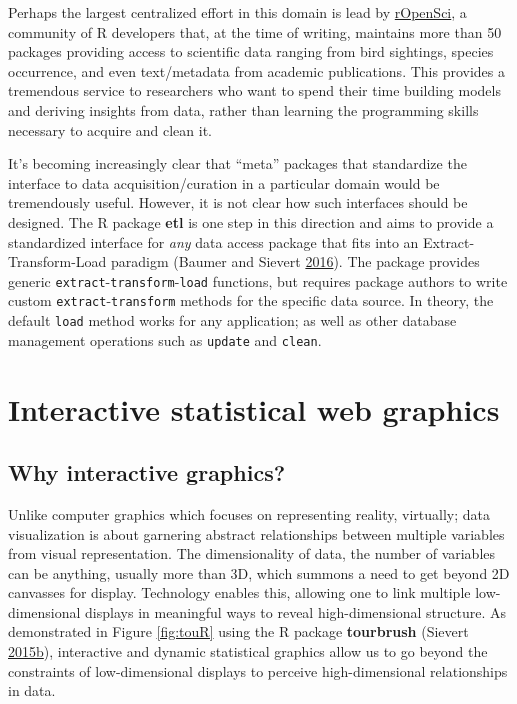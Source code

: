 \documentclass[12pt,]{isuthesis}
\begin{document}
Perhaps the largest centralized effort in this domain is lead by
\href{https://ropensci.org}{rOpenSci}, a community of R developers that,
at the time of writing, maintains more than 50 packages providing access
to scientific data ranging from bird sightings, species occurrence, and
even text/metadata from academic publications. This provides a
tremendous service to researchers who want to spend their time building
models and deriving insights from data, rather than learning the
programming skills necessary to acquire and clean it.

It's becoming increasingly clear that ``meta'' packages that standardize
the interface to data acquisition/curation in a particular domain would
be tremendously useful. However, it is not clear how such interfaces
should be designed. The R package \textbf{etl} is one step in this
direction and aims to provide a standardized interface for \emph{any}
data access package that fits into an Extract-Transform-Load paradigm
(Baumer and Sievert \protect\hyperlink{ref-etl}{2016}). The package
provides generic \texttt{extract}-\texttt{transform}-\texttt{load}
functions, but requires package authors to write custom
\texttt{extract}-\texttt{transform} methods for the specific data
source. In theory, the default \texttt{load} method works for any
application; as well as other database management operations such as
\texttt{update} and \texttt{clean}.

\section{Interactive statistical web
graphics}\label{interactive-statistical-web-graphics}

\subsection{Why interactive graphics?}\label{why-interactive-graphics}

Unlike computer graphics which focuses on representing reality,
virtually; data visualization is about garnering abstract relationships
between multiple variables from visual representation. The
dimensionality of data, the number of variables can be anything, usually
more than 3D, which summons a need to get beyond 2D canvasses for
display. Technology enables this, allowing one to link multiple
low-dimensional displays in meaningful ways to reveal high-dimensional
structure. As demonstrated in Figure \ref{fig:touR} using the R package
\textbf{tourbrush} (Sievert
\protect\hyperlink{ref-tourbrush}{2015}\protect\hyperlink{ref-tourbrush}{b}),
interactive and dynamic statistical graphics allow us to go beyond the
constraints of low-dimensional displays to perceive high-dimensional
relationships in data.
\end{document}
